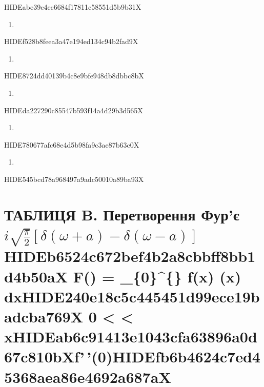 \documentclass[
  ukrainian,
]{article}
\providecommand{\tightlist}{%
  \setlength{\itemsep}{0pt}\setlength{\parskip}{0pt}}
\begin{document}
HIDEabe39c4ec6684f17811c58551d5b9b31X

\begin{enumerate}
\def\labelenumi{\arabic{enumi}.}
\setcounter{enumi}{16}
\tightlist
\item
\end{enumerate}

HIDEf528b8feea3a47e194ed134c94b2fad9X

\begin{enumerate}
\def\labelenumi{\arabic{enumi}.}
\setcounter{enumi}{17}
\tightlist
\item
\end{enumerate}

HIDE8724dd40139b4c8e9bfe948db8dbbc8bX

\begin{enumerate}
\def\labelenumi{\arabic{enumi}.}
\setcounter{enumi}{18}
\tightlist
\item
\end{enumerate}

HIDEda227290c85547b593f14a4d29b3d565X

\begin{enumerate}
\def\labelenumi{\arabic{enumi}.}
\setcounter{enumi}{18}
\tightlist
\item
\end{enumerate}

HIDE780677afc68e4d5b98fa9c3ae87b63c0X

\begin{enumerate}
\def\labelenumi{\arabic{enumi}.}
\setcounter{enumi}{9}
\tightlist
\item
\end{enumerate}

HIDE545bcd78a968497a9adc50010a89ba93X

\section{\texorpdfstring{ТАБЛИЦЯ B. Перетворення Фур'є
\(i \sqrt{\frac{\pi}{2}} [\delta(\omega+a) - \delta(\omega-a)]\)
HIDEb6524c672bef4b2a8cbbff8bb1d4b50aX F(\omega) = 
\int\_\{0\}\^{}\{\infty\} f(x) \sin(\omega x)
dxHIDE240e18c5c445451d99ece19badcba769X 0 \textless{} \omega \textless{}
xHIDEab6c91413e1043cfa63896a0d67c810bXf'\,'(0)HIDEfb6b4624c7ed45368aea86e4692a687aX}{ТАБЛИЦЯ B. Перетворення Фур'є i \textbackslash sqrt\{\textbackslash frac\{\textbackslash pi\}\{2\}\} {[}\textbackslash delta(\textbackslash omega+a) - \textbackslash delta(\textbackslash omega-a){]} HIDEb6524c672bef4b2a8cbbff8bb1d4b50aX F() =  \_\{0\}\^{}\{\} f(x) (x) dxHIDE240e18c5c445451d99ece19badcba769X 0 \textless{} \textless{} xHIDEab6c91413e1043cfa63896a0d67c810bXf'\,'(0)HIDEfb6b4624c7ed45368aea86e4692a687aX}}\label{ux442ux430ux431ux43bux438ux446ux44f-b.-ux43fux435ux440ux435ux442ux432ux43eux440ux435ux43dux43dux44f-ux444ux443ux440ux454-i-sqrtfracpi2-deltaomegaa---deltaomega-a-hideb6524c672bef4b2a8cbbff8bb1d4b50ax-f-_0-fx-x-dxhide240e18c5c445451d99ece19badcba769x-0-xhideab6c91413e1043cfa63896a0d67c810bxf0hidefb6b4624c7ed45368aea86e4692a687ax}
\end{document}
